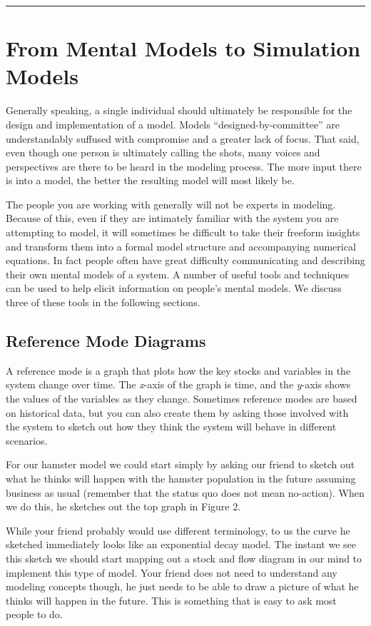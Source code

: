 \documentclass[]{memoir}
\begin{document}
\begin{center}\rule{3in}{0.4pt}\end{center}

\section{From Mental Models to Simulation Models}

Generally speaking, a single individual should ultimately be responsible
for the design and implementation of a model. Models
``designed-by-committee'' are understandably suffused with compromise
and a greater lack of focus. That said, even though one person is
ultimately calling the shots, many voices and perspectives are there to
be heard in the modeling process. The more input there is into a model,
the better the resulting model will most likely be.

The people you are working with generally will not be experts in
modeling. Because of this, even if they are intimately familiar with the
system you are attempting to model, it will sometimes be difficult to
take their freeform insights and transform them into a formal model
structure and accompanying numerical equations. In fact people often
have great difficulty communicating and describing their own mental
models of a system. A number of useful tools and techniques can be used
to help elicit information on people's mental models. We discuss three
of these tools in the following sections.

\subsection{Reference Mode Diagrams}

A reference mode is a graph that plots how the key stocks and variables
in the system change over time. The \emph{x}-axis of the graph is time,
and the \emph{y}-axis shows the values of the variables as they change.
Sometimes reference modes are based on historical data, but you can also
create them by asking those involved with the system to sketch out how
they think the system will behave in different scenarios.

For our hamster model we could start simply by asking our friend to
sketch out what he thinks will happen with the hamster population in the
future assuming business as usual (remember that the status quo does not
mean no-action). When we do this, he sketches out the top graph in
Figure 2.

While your friend probably would use different terminology, to us the
curve he sketched immediately looks like an exponential decay model. The
instant we see this sketch we should start mapping out a stock and flow
diagram in our mind to implement this type of model. Your friend does
not need to understand any modeling concepts though, he just needs to be
able to draw a picture of what he thinks will happen in the future. This
is something that is easy to ask most people to do.
\end{document}
